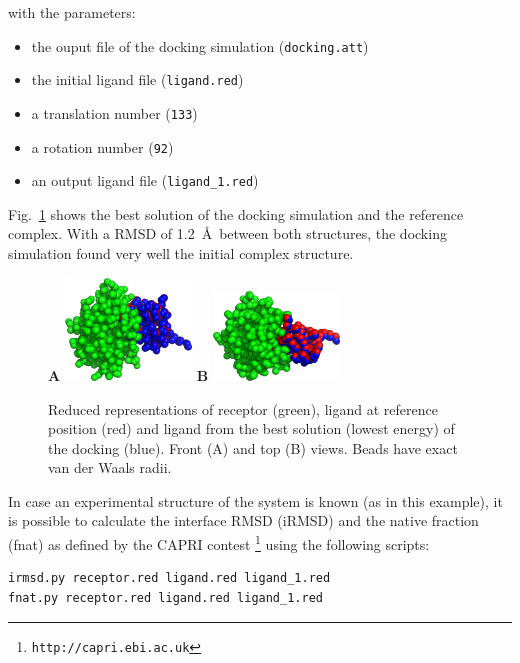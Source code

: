 \documentclass[12pt,a4paper]{article}
\begin{document}
with the parameters:
\begin{itemize}
\item the ouput file of the docking simulation ({\tt docking.att})
\item the initial ligand file ({\tt ligand.red})
\item a translation number ({\tt 133})
\item a rotation number ({\tt 92})
\item an output ligand file ({\tt ligand\_1.red})
\end{itemize}

Fig.~\ref{1CGI_dock} shows the best solution of the docking simulation and the
reference complex. With a RMSD of 1.2~\AA\ between both structures, 
the docking simulation found very well the initial complex structure.

\begin{figure}[htbp]
\center
{\textbf A}
\includegraphics*[width=0.30\textwidth]{img/1CGI_dock1_front.png}
\hspace*{2cm}
{\textbf B}
\includegraphics*[width=0.30\textwidth]{img/1CGI_dock1_top.png}
\caption{Reduced representations of receptor (green), ligand at reference 
position (red) and ligand from the best solution (lowest energy) of the 
docking (blue). Front (A) and top (B) views. Beads have exact van der 
Waals radii.}
\label{1CGI_dock}
\end{figure}

In case an experimental structure of the system is known (as in this example), 
it is possible to calculate the interface RMSD (iRMSD) and the native fraction 
(fnat) as defined by the CAPRI contest \footnote{\tt http://capri.ebi.ac.uk}
using the following scripts:

\begin{verbatim}
irmsd.py receptor.red ligand.red ligand_1.red
fnat.py receptor.red ligand.red ligand_1.red
\end{verbatim}
\end{document}
